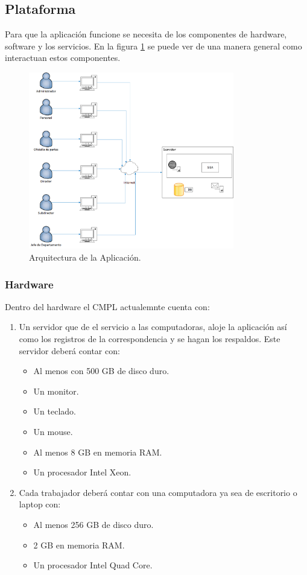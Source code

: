 \subsection{Plataforma}

Para que la aplicación funcione se necesita de los componentes de hardware, software y los servicios. En la figura \ref{arquitectura} se puede ver de una manera general como interactuan estos componentes. \\

\begin{figure}[htbp!]
		\centering
			\includegraphics[width=0.8\textwidth]{images/propuesta/arquitectura}
		\caption{Arquitectura de la Aplicación.}
		\label{arquitectura}
	\end{figure}

\subsubsection{Hardware}

Dentro del hardware el CMPL actualemnte cuenta con:
\begin{enumerate}
	\item Un servidor que de el servicio a las computadoras, aloje la aplicación así como los registros de la correspondencia y se hagan los respaldos. Este servidor deberá contar con: 
	\begin{itemize}
		\item Al menos con 500 GB de disco duro.
		\item Un monitor.
		\item Un teclado.
		\item Un mouse.
		\item Al menos 8 GB en memoria RAM.
		\item Un procesador Intel Xeon.
	\end{itemize}
	\item Cada trabajador deberá contar con una computadora ya sea de escritorio o laptop con: 
	\begin{itemize}
		\item Al menos 256 GB de disco duro.
		\item 2 GB en memoria RAM.
		\item Un procesador Intel Quad Core. 
	\end{itemize}
\end{enumerate}

